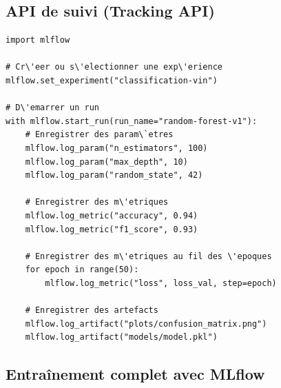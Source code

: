 \subsection{API de suivi (Tracking API)}

\begin{codeblock}[title=\textbf{Concepts fondamentaux de MLflow Tracking}]
\begin{verbatim}
import mlflow

# Cr\'eer ou s\'electionner une exp\'erience
mlflow.set_experiment("classification-vin")

# D\'emarrer un run
with mlflow.start_run(run_name="random-forest-v1"):
    # Enregistrer des param\`etres
    mlflow.log_param("n_estimators", 100)
    mlflow.log_param("max_depth", 10)
    mlflow.log_param("random_state", 42)

    # Enregistrer des m\'etriques
    mlflow.log_metric("accuracy", 0.94)
    mlflow.log_metric("f1_score", 0.93)

    # Enregistrer des m\'etriques au fil des \'epoques
    for epoch in range(50):
        mlflow.log_metric("loss", loss_val, step=epoch)

    # Enregistrer des artefacts
    mlflow.log_artifact("plots/confusion_matrix.png")
    mlflow.log_artifact("models/model.pkl")
\end{verbatim}
\end{codeblock}

\subsection{Entra\^inement complet avec MLflow}

